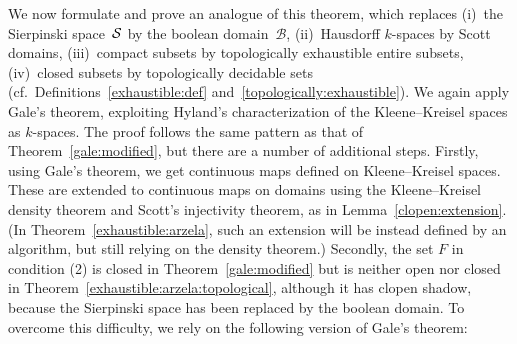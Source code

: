 \documentclass{LMCS}
\newcommand{\pBool}{\mathcal{B}}
\begin{document}
We now formulate and prove an analogue of this theorem, which replaces
(i)~the Sierpinski space~$\mathcal{S}$ by the boolean domain~$\pBool$,
(ii)~Hausdorff $k$-spaces by Scott domains, (iii)~compact subsets by
topologically exhaustible entire subsets, (iv)~closed subsets by
topologically decidable sets (cf.\ Definitions~\ref{exhaustible:def}
and~\ref{topologically:exhaustible}).  We again apply Gale's theorem,
exploiting Hyland's characterization of the Kleene--Kreisel spaces as
$k$-spaces.  The proof follows the same pattern as that of
Theorem~\ref{gale:modified}, but there are a number of additional
steps. Firstly, using Gale's theorem, we get continuous maps defined
on Kleene--Kreisel spaces.  These are extended to continuous maps on
domains using the Kleene--Kreisel density theorem and Scott's
injectivity theorem, as in Lemma~\ref{clopen:extension}.  (In
Theorem~\ref{exhaustible:arzela}, such an extension will be instead
defined by an algorithm, but still relying on the density theorem.)
Secondly, the set $F$ in condition (2) is closed in
Theorem~\ref{gale:modified} but is neither open nor closed in
Theorem~\ref{exhaustible:arzela:topological}, although it has clopen
shadow, because the Sierpinski space has been replaced by the boolean
domain. To overcome this difficulty, we rely on the following version
of Gale's theorem:
\end{document}
